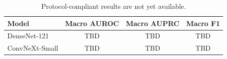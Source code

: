 \begin{table}[t]
\centering
\caption{Protocol-compliant results are not yet available.}
\label{tab:protocol-results}
\begin{tabular}{lccc}
\toprule
Model & Macro AUROC & Macro AUPRC & Macro F1 \\
\midrule
DenseNet-121 & TBD & TBD & TBD \\
ConvNeXt-Small & TBD & TBD & TBD \\
\bottomrule
\end{tabular}
\end{table}
